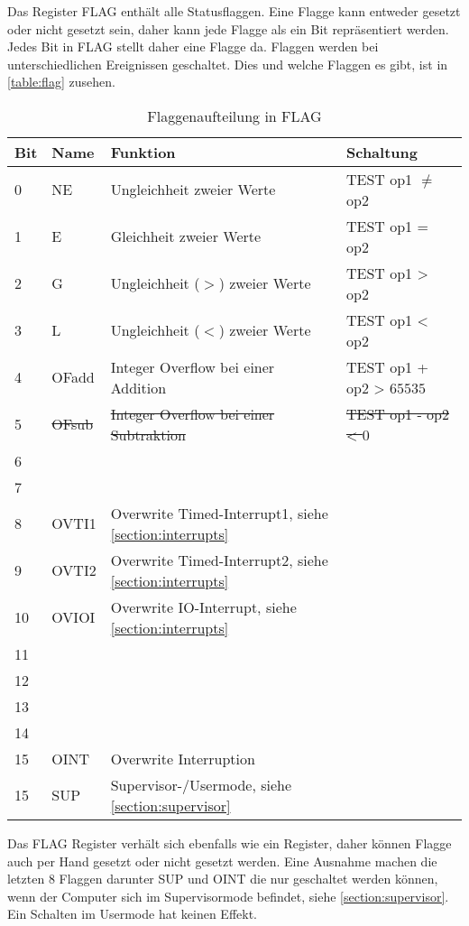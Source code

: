 \documentclass{scrartcl}
\begin{document}
Das Register FLAG enthält alle Statusflaggen.
Eine Flagge kann entweder gesetzt oder nicht gesetzt sein, daher kann jede Flagge als ein Bit repräsentiert werden.
Jedes Bit in FLAG stellt daher eine Flagge da. Flaggen werden bei unterschiedlichen Ereignissen geschaltet.
Dies und welche Flaggen es gibt, ist in \autoref{table:flag} zusehen.

\begin{center}
	\begin{table}[h]
		\caption{\label{table:flag}Flaggenaufteilung in FLAG}
		\begin{tabular}{l | l | l | l}
			Bit & Name & Funktion & Schaltung \\
			\hline
			 0 & NE    & Ungleichheit zweier Werte					& TEST op1 $\neq$ op2\\
			 1 & E     & Gleichheit zweier Werte 					& TEST op1 = op2\\
			 2 & G     & Ungleichheit ($>$) zweier Werte 			& TEST op1 > op2\\
			 3 & L     & Ungleichheit ($<$) zweier Werte 			& TEST op1 < op2\\
			 4 & OFadd & Integer Overflow bei einer Addition 		& TEST op1 + op2 > $65535$ \\
			 5 & \sout{OFsub} & \sout{Integer Overflow bei einer Subtraktion} 	& \sout{TEST op1 - op2 < $0$} \\
			 6 &  &  & \\
			 7 &  &  & \\
			 8 & OVTI1 & Overwrite Timed-Interrupt1, siehe \autoref{section:interrupts} &  \\
			 9 & OVTI2 & Overwrite Timed-Interrupt2, siehe \autoref{section:interrupts} &  \\
			10 & OVIOI & Overwrite IO-Interrupt, siehe \autoref{section:interrupts} &  \\
			11 &  &  &  \\
			12 &  &  &  \\
			13 &  &  &  \\
			14 &  &  &  \\
			15 & OINT & Overwrite Interruption &  \\
			15 & SUP & Supervisor-/Usermode, siehe \autoref{section:supervisor} & 
		\end{tabular}
	\end{table}
\end{center}

Das FLAG Register verhält sich ebenfalls wie ein Register, daher können Flagge auch per Hand gesetzt oder nicht gesetzt werden.
Eine Ausnahme machen die letzten 8 Flaggen darunter SUP und OINT die nur geschaltet werden können, wenn der Computer sich im Supervisormode befindet, siehe \autoref{section:supervisor}.
Ein Schalten im Usermode hat keinen Effekt.
\end{document}
